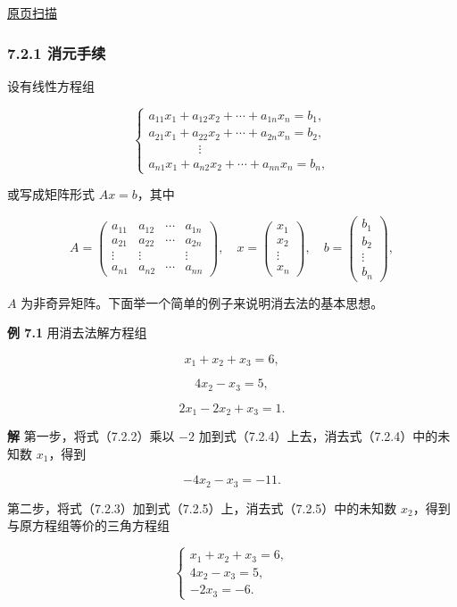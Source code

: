 \documentclass[
  10pt,
  fontset=fandol]{ctexart}
\begin{document}
\href{../../source-images/pdf-178.jpeg}{原页扫描}

\subsubsection{7.2.1 消元手续}\label{ux6d88ux5143ux624bux7eed}

设有线性方程组

\[
\begin{cases}
a_{11}x_1+a_{12}x_2+\cdots+a_{1n}x_n=b_1,\\
a_{21}x_1+a_{22}x_2+\cdots+a_{2n}x_n=b_2,\\
\qquad\qquad\vdots\\
a_{n1}x_1+a_{n2}x_2+\cdots+a_{nn}x_n=b_n,
\end{cases}
\tag{7.2.1}
\]

或写成矩阵形式 \(Ax=b\)，其中

\[
A=\begin{pmatrix}
a_{11}&a_{12}&\cdots&a_{1n}\\
a_{21}&a_{22}&\cdots&a_{2n}\\
\vdots&\vdots&&\vdots\\
a_{n1}&a_{n2}&\cdots&a_{nn}
\end{pmatrix},\quad
x=\begin{pmatrix}x_1\\x_2\\\vdots\\x_n\end{pmatrix},\quad
b=\begin{pmatrix}b_1\\b_2\\\vdots\\b_n\end{pmatrix},
\]

\(A\) 为非奇异矩阵。下面举一个简单的例子来说明消去法的基本思想。

\textbf{例 7.1} 用消去法解方程组

\[x_1+x_2+x_3=6,\tag{7.2.2}\]

\[4x_2-x_3=5,\tag{7.2.3}\]

\[2x_1-2x_2+x_3=1.\tag{7.2.4}\]

\textbf{解} 第一步，将式（7.2.2）乘以 \(-2\) 加到式（7.2.4）上去，消去式（7.2.4）中的未知数 \(x_1\)，得到

\[-4x_2-x_3=-11.\tag{7.2.5}\]

第二步，将式（7.2.3）加到式（7.2.5）上，消去式（7.2.5）中的未知数 \(x_2\)，得到与原方程组等价的三角方程组

\[
\begin{cases}
x_1+x_2+x_3=6,\\
4x_2-x_3=5,\\
-2x_3=-6.
\end{cases}
\tag{7.2.6}
\]
\end{document}
